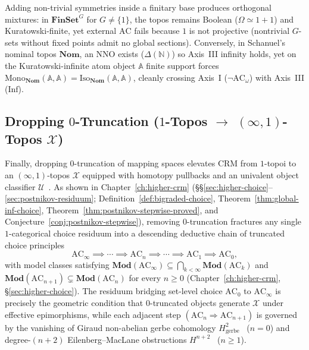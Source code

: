 \documentclass[10pt,twoside,openright]{book}
\theoremstyle{crmplain}
\theoremstyle{crmdef}
\theoremstyle{crmremark}
\begin{document}
Adding non-trivial symmetries inside a finitary base produces orthogonal mixtures: in $\mathbf{FinSet}^G$ for $G \neq \{1\}$, the topos remains Boolean ($\Omega \simeq 1+1$) and Kuratowski-finite, yet external $\mathrm{AC}$ fails because $1$ is not projective (nontrivial $G$-sets without fixed points admit no global sections). Conversely, in Schanuel's nominal topos $\mathbf{Nom}$, an $\mathrm{NNO}$ exists ($\Delta(\mathbb{N})$) so Axis~III infinity holds, yet on the Kuratowski-infinite atom object $\mathbb{A}$ finite support forces $\mathrm{Mono}_{\mathbf{Nom}}(\mathbb{A},\mathbb{A}) = \mathrm{Iso}_{\mathbf{Nom}}(\mathbb{A},\mathbb{A})$, cleanly crossing Axis~I ($\neg\mathrm{AC}_\omega$) with Axis~III ($\mathrm{Inf}$).

\subsection{\texorpdfstring{Dropping $0$-Truncation ($1$-Topos $\to$ $(\infty, 1)$-Topos $\mathcal{X}$)}{Dropping 0-Truncation (1-Topos -> (infinity, 1)-Topos X)}}\label{sec:axis1-truncation}

Finally, dropping $0$-truncation of mapping spaces elevates $\mathrm{CRM}$ from $1$-topoi to an $(\infty, 1)$-topos $\mathcal{X}$ equipped with homotopy pullbacks and an univalent object classifier $\mathcal{U}$~\cite{Lurie09,GepnerKock17}. As shown in Chapter~\ref{ch:higher-crm} (\S\S\ref{sec:higher-choice}--\ref{sec:postnikov-residuum}; Definition~\ref{def:bigraded-choice}, Theorem~\ref{thm:global-inf-choice}, Theorem~\ref{thm:postnikov-stepwise-proved}, and Conjecture~\ref{conj:postnikov-stepwise}), removing $0$-truncation fractures any single $1$-categorical choice residuum into a descending deductive chain of truncated choice principles
\[
  \mathrm{AC}_\infty \implies \cdots \implies \mathrm{AC}_n \implies \cdots \implies \mathrm{AC}_1 \implies \mathrm{AC}_0,
\]
with model classes satisfying $\mathbf{Mod}(\mathrm{AC}_\infty) \subseteq \bigcap_{k < \infty} \mathbf{Mod}(\mathrm{AC}_k)$ and $\mathbf{Mod}(\mathrm{AC}_{n+1}) \subsetneq \mathbf{Mod}(\mathrm{AC}_n)$ for every $n \ge 0$ (Chapter~\ref{ch:higher-crm}, \S\ref{sec:higher-choice}). The residuum bridging set-level choice $\mathrm{AC}_0$ to $\mathrm{AC}_\infty$ is precisely the geometric condition that $0$-truncated objects generate $\mathcal{X}$ under effective epimorphisms, while each adjacent step $(\mathrm{AC}_n \Rightarrow \mathrm{AC}_{n+1})$ is governed by the vanishing of Giraud non-abelian gerbe cohomology $H^2_{\mathrm{gerbe}}$~\cite[Ch.~IV]{Giraud71} ($n=0$) and degree-$(n+2)$ Eilenberg--MacLane obstructions $H^{n+2}$~\cite[\S 7.2.2]{Lurie09} ($n \ge 1$).
\end{document}

